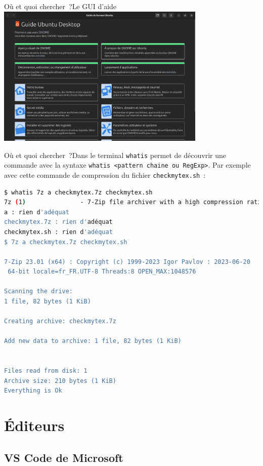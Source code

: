 \documentclass{beamer}
\begin{document}
    \begin{frame}{Où et quoi chercher~?}{Le GUI d'aide}
        \centering
        \includegraphics[width=10cm]{image/aide}
    \end{frame}

    \begin{frame}[fragile]{Où et quoi chercher~?}{Dans le terminal}
        \lstinline{whatis} permet de découvrir une commande avec la syntaxe \lstinline{whatis <pattern chaine ou RegExp>}.
        \bigbreak
        Par exemple avec cette commande de compression du fichier \lstinline{checkmytex.sh}~:
        \begin{lstlisting}[language=bash,basicstyle=\tiny\ttfamily]
$ whatis 7z a checkmytex.7z checkmytex.sh
7z (1)               - 7-Zip file archiver with a high compression ratio
a : rien d'adéquat
checkmytex.7z : rien d'adéquat
checkmytex.sh : rien d'adéquat
$ 7z a checkmytex.7z checkmytex.sh

7-Zip 23.01 (x64) : Copyright (c) 1999-2023 Igor Pavlov : 2023-06-20
 64-bit locale=fr_FR.UTF-8 Threads:8 OPEN_MAX:1048576

Scanning the drive:
1 file, 82 bytes (1 KiB)

Creating archive: checkmytex.7z

Add new data to archive: 1 file, 82 bytes (1 KiB)


Files read from disk: 1
Archive size: 210 bytes (1 KiB)
Everything is Ok
        \end{lstlisting}
    \end{frame}


    \section{Éditeurs}\label{sec:editor}

    \subsection{VS Code de Microsoft}\label{subsec:vscode}
\end{document}
